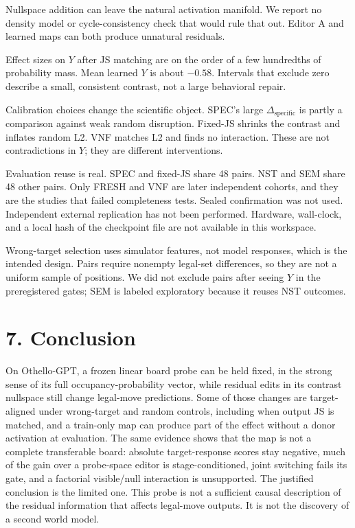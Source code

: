 \documentclass[11pt]{article}
\begin{document}
Nullspace addition can leave the natural activation manifold. We report no density model or cycle-consistency check that would rule that out. Editor A and learned maps can both produce unnatural residuals.

Effect sizes on \(Y\) after JS matching are on the order of a few hundredths of probability mass. Mean learned \(Y\) is about \(-0.58\). Intervals that exclude zero describe a small, consistent contrast, not a large behavioral repair.

Calibration choices change the scientific object. SPEC's large \(\Delta_{\mathrm{specific}}\) is partly a comparison against weak random disruption. Fixed-JS shrinks the contrast and inflates random L2. VNF matches L2 and finds no interaction. These are not contradictions in \(Y\); they are different interventions.

Evaluation reuse is real. SPEC and fixed-JS share 48 pairs. NST and SEM share 48 other pairs. Only FRESH and VNF are later independent cohorts, and they are the studies that failed completeness tests. Sealed confirmation was not used. Independent external replication has not been performed. Hardware, wall-clock, and a local hash of the checkpoint file are not available in this workspace.

Wrong-target selection uses simulator features, not model responses, which is the intended design. Pairs require nonempty legal-set differences, so they are not a uniform sample of positions. We did not exclude pairs after seeing \(Y\) in the preregistered gates; SEM is labeled exploratory because it reuses NST outcomes.

\section{7. Conclusion}

On Othello-GPT, a frozen linear board probe can be held fixed, in the strong sense of its full occupancy-probability vector, while residual edits in its contrast nullspace still change legal-move predictions. Some of those changes are target-aligned under wrong-target and random controls, including when output JS is matched, and a train-only map can produce part of the effect without a donor activation at evaluation. The same evidence shows that the map is not a complete transferable board: absolute target-response scores stay negative, much of the gain over a probe-space editor is stage-conditioned, joint switching fails its gate, and a factorial visible/null interaction is unsupported. The justified conclusion is the limited one. This probe is not a sufficient causal description of the residual information that affects legal-move outputs. It is not the discovery of a second world model.
\end{document}
